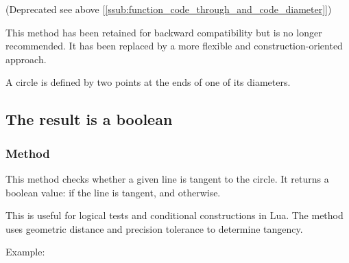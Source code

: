 (Deprecated see above [\ref{ssub:function_code_through_and_code_diameter}])

This method has been retained for backward compatibility but is no longer recommended. It has been replaced by a more flexible and construction-oriented approach.

A circle is defined by two points at the ends of one of its diameters.

\vspace{1em}
\begin{tkzexample}[latex=.5\textwidth]
\begin{center}
\end{center}
\end{tkzexample}

\subsection{The result is a boolean}

\subsubsection{Method }
\label{ssub:method_circle_is__tangent}

This method checks whether a given line is tangent to the circle. It returns a boolean value:  if the line is tangent, and  otherwise.

\medskip
\noindent
This is useful for logical tests and conditional constructions in Lua. The method uses geometric distance and precision tolerance to determine tangency.

\medskip
\noindent
Example:

\begin{tkzexample}[latex=.5\textwidth]
\end{tkzexample}

